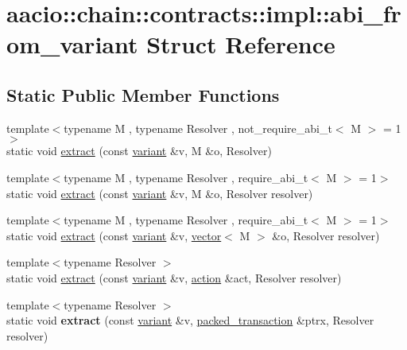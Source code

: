 \hypertarget{structaacio_1_1chain_1_1contracts_1_1impl_1_1abi__from__variant}{}\section{aacio\+:\+:chain\+:\+:contracts\+:\+:impl\+:\+:abi\+\_\+from\+\_\+variant Struct Reference}
\label{structaacio_1_1chain_1_1contracts_1_1impl_1_1abi__from__variant}
\subsection*{Static Public Member Functions}
\begin{DoxyCompactItemize}
\item 
{\footnotesize template$<$typename M , typename Resolver , not\+\_\+require\+\_\+abi\+\_\+t$<$ M $>$  = 1$>$ }\\static void \mbox{\hyperlink{structaacio_1_1chain_1_1contracts_1_1impl_1_1abi__from__variant_a9cb52ff1470a191b4d205cf10c9055d0}{extract}} (const \mbox{\hyperlink{classfc_1_1variant}{variant}} \&v, M \&o, Resolver)
\item 
{\footnotesize template$<$typename M , typename Resolver , require\+\_\+abi\+\_\+t$<$ M $>$  = 1$>$ }\\static void \mbox{\hyperlink{structaacio_1_1chain_1_1contracts_1_1impl_1_1abi__from__variant_a8fab03e140641be689b3b855437c36c6}{extract}} (const \mbox{\hyperlink{classfc_1_1variant}{variant}} \&v, M \&o, Resolver resolver)
\item 
{\footnotesize template$<$typename M , typename Resolver , require\+\_\+abi\+\_\+t$<$ M $>$  = 1$>$ }\\static void \mbox{\hyperlink{structaacio_1_1chain_1_1contracts_1_1impl_1_1abi__from__variant_abd7d961246232db8be8d0550876d47d6}{extract}} (const \mbox{\hyperlink{classfc_1_1variant}{variant}} \&v, \mbox{\hyperlink{classstd_1_1vector}{vector}}$<$ M $>$ \&o, Resolver resolver)
\item 
{\footnotesize template$<$typename Resolver $>$ }\\static void \mbox{\hyperlink{structaacio_1_1chain_1_1contracts_1_1impl_1_1abi__from__variant_a94db60a8aa274449117af1b9e5c18bba}{extract}} (const \mbox{\hyperlink{classfc_1_1variant}{variant}} \&v, \mbox{\hyperlink{structaacio_1_1chain_1_1action}{action}} \&act, Resolver resolver)
\item 
\mbox{\label{structaacio_1_1chain_1_1contracts_1_1impl_1_1abi__from__variant_a9d90269317f0cbcd9953585b8c9c942e}} 
{\footnotesize template$<$typename Resolver $>$ }\\static void {\bfseries extract} (const \mbox{\hyperlink{classfc_1_1variant}{variant}} \&v, \mbox{\hyperlink{structaacio_1_1chain_1_1packed__transaction}{packed\+\_\+transaction}} \&ptrx, Resolver resolver)
\end{DoxyCompactItemize}


